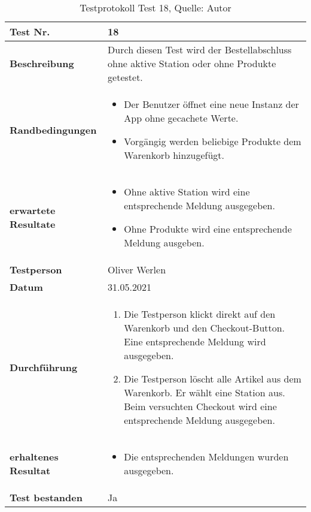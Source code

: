 \begin{table}[H]
	\setlength\extrarowheight{2pt} %
	\begin{tabularx}{\textwidth}{|l|X|}
		\hline
		\textbf{Test Nr.} & 18\\
		\hline
		\textbf{Beschreibung} & Durch diesen Test wird der Bestellabschluss ohne aktive Station oder ohne Produkte getestet.  \\
		\hline
		\textbf{Randbedingungen} &
		\begin{minipage}[t]{0.6\textwidth}
			\begin{itemize}
				\item Der Benutzer öffnet eine neue Instanz der App ohne gecachete Werte. 
				\item Vorgängig werden beliebige Produkte dem Warenkorb hinzugefügt. 
			\end{itemize}
		\end{minipage} \\
		\hline
		\textbf{erwartete Resultate}  &
		\begin{minipage}[t]{0.6\textwidth}
			\begin{itemize}
				\item Ohne aktive Station wird eine entsprechende Meldung ausgegeben. 
				\item Ohne Produkte wird eine entsprechende Meldung ausgeben. 
			\end{itemize}
		\end{minipage} \\
		\hline
		\textbf{Testperson} & Oliver Werlen \\
		\hline
		\textbf{Datum} & 31.05.2021 \\
		\hline
		\textbf{Durchführung} &
		\begin{minipage}[t]{0.6\textwidth}
			\begin{enumerate}
				\item Die Testperson klickt direkt auf den Warenkorb und den Checkout-Button. Eine entsprechende Meldung wird ausgegeben. 
				\item Die Testperson löscht alle Artikel aus dem Warenkorb. Er wählt eine Station aus. Beim versuchten Checkout wird eine entsprechende Meldung ausgegeben. 
			\end{enumerate}
		\end{minipage} \\
		\hline
		\textbf{erhaltenes Resultat} &
		\begin{minipage}[t]{0.6\textwidth}
			\begin{itemize}
				\item Die entsprechenden Meldungen wurden ausgegeben.
			\end{itemize}
		\end{minipage} \\
		\hline
		\textbf{Test bestanden} & Ja \\
		\hline
	\end{tabularx}
	\caption{ \label{tbl: testprotokoll18}Testprotokoll Test 18, Quelle: Autor}
\end{table}
